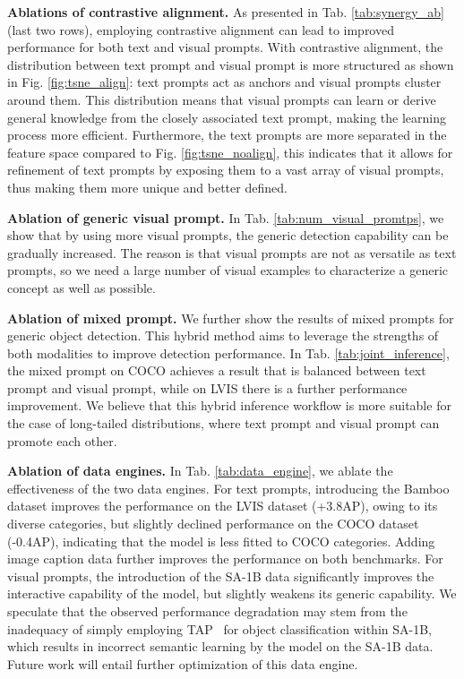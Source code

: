 \noindent\textbf{Ablations of contrastive alignment.}
As presented in Tab. \ref{tab:synergy_ab} (last two rows), employing contrastive alignment can lead to improved performance for both text and visual prompts. With contrastive alignment, the distribution between text prompt and visual prompt is more structured as shown in Fig. \ref{fig:tsne_align}: text prompts act as anchors and visual prompts cluster around them. This distribution means that visual prompts can learn or derive general knowledge from the closely associated text prompt, making the learning process more efficient. Furthermore, the text prompts are more separated in the feature space compared to Fig. \ref{fig:tsne_noalign}, this indicates that it allows for refinement of text prompts by exposing them to a vast array of visual prompts, thus making them more unique and better defined.


\noindent\textbf{Ablation of generic visual prompt.} In Tab. \ref{tab:num_visual_promtps}, we show that by using more visual prompts, the generic detection capability can be gradually increased. The reason is that visual prompts are not as versatile as text prompts, so we need a large number of visual examples to characterize a generic concept as well as possible. 

\noindent\textbf{Ablation of mixed prompt.}  We further show the results of mixed prompts for generic object detection. This hybrid method aims to leverage the strengths of both modalities to improve detection performance. In Tab. \ref{tab:joint_inference}, the mixed prompt on COCO achieves a result that is balanced between text prompt and visual prompt, while on LVIS there is a further performance improvement. We believe that this hybrid inference workflow is more suitable for the case of long-tailed distributions, where text prompt and visual prompt can promote each other. 

\noindent\textbf{Ablation of data engines.} In Tab. \ref{tab:data_engine}, we ablate the effectiveness of the two data engines. For text prompts, introducing the Bamboo dataset improves the performance on the LVIS dataset (+3.8AP), owing to its diverse categories, but slightly declined performance on the COCO dataset (-0.4AP), indicating that the model is less fitted to COCO categories. Adding image caption data further improves the performance on both benchmarks. For visual prompts, the introduction of the SA-1B data significantly improves the interactive capability of the model, but slightly weakens its generic capability. We speculate that the observed performance degradation may stem from the inadequacy of simply employing TAP~\cite{pan2023tokenize} for object classification within SA-1B, which results in incorrect semantic learning by the model on the SA-1B data. Future work will entail further optimization of this data engine.

